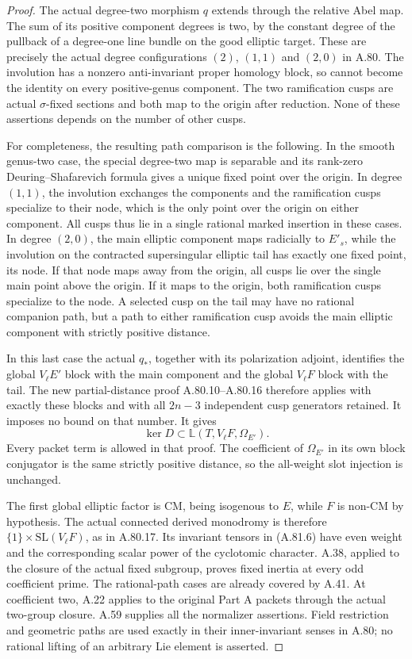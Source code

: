 \begin{proof}
The actual degree-two morphism \(q\) extends through
the relative Abel map. The sum of its positive component
degrees is two, by the constant degree of the pullback
of a degree-one line bundle on the good elliptic target.
These are precisely the actual degree configurations
\((2)\), \((1,1)\) and \((2,0)\) in A.80.
The involution has a nonzero anti-invariant proper
homology block, so cannot become the identity on every
positive-genus component. The two ramification cusps
are actual \(\sigma\)-fixed sections and both map to
the origin after reduction. None of these assertions
depends on the number of other cusps.

For completeness, the resulting path comparison is the
following. In the smooth genus-two case, the special
degree-two map is separable and its rank-zero
Deuring--Shafarevich formula gives a unique fixed point
over the origin. In degree \((1,1)\), the involution
exchanges the components and the ramification cusps
specialize to their node, which is the only point over
the origin on either component. All cusps thus lie in
a single rational marked insertion in these cases.
In degree \((2,0)\), the main elliptic component maps
radicially to \(E'_s\), while the involution on the
contracted supersingular elliptic tail has exactly one
fixed point, its node. If that node maps away from the
origin, all cusps lie over the single main point above
the origin. If it maps to the origin, both ramification
cusps specialize to the node. A selected cusp on the
tail may have no rational companion path, but a path
to either ramification cusp avoids the main elliptic
component with strictly positive distance.

In this last case the actual \(q_*\), together with
its polarization adjoint, identifies the global
\(V_\ell E'\) block with the main component and the
global \(V_\ell F\) block with the tail. The new
partial-distance proof A.80.10--A.80.16 therefore applies
with exactly these blocks and with all \(2n-3\)
independent cusp generators retained. It imposes no
bound on that number. It gives
\[
              \ker D\subset\mathbb L(T,V_\ell F,\Omega_{E'}).
                                                        \tag{A.81.6}
\]
Every packet term is allowed in that proof. The
coefficient of \(\Omega_{E'}\) in its own block
conjugator is the same strictly positive distance, so
the all-weight slot injection is unchanged.

The first global elliptic factor is CM, being isogenous
to \(E\), while \(F\) is non-CM by hypothesis.
The actual connected derived monodromy is therefore
\(\{1\}\times\mathrm{SL}(V_\ell F)\), as in
A.80.17. Its invariant tensors in (A.81.6) have even
weight and the corresponding scalar power of the
cyclotomic character. A.38, applied to the closure of
the actual fixed subgroup, proves fixed inertia at
every odd coefficient prime. The rational-path cases
are already covered by A.41. At coefficient two,
A.22 applies to the original Part A packets through
the actual two-group closure. A.59 supplies all the
normalizer assertions. Field restriction and geometric
paths are used exactly in their inner-invariant senses
in A.80; no rational lifting of an arbitrary Lie
element is asserted.


\end{proof}
